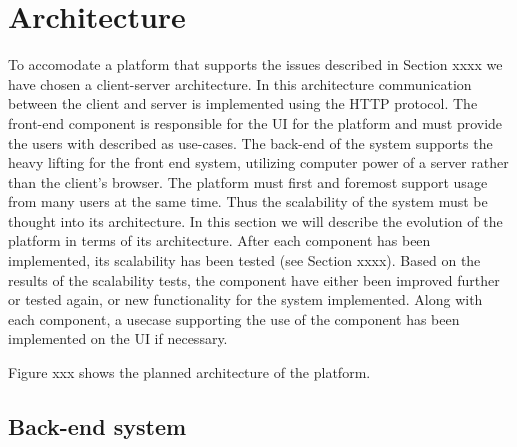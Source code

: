 \section{Architecture}
To accomodate a platform that supports the issues described in Section xxxx  we have chosen a client-server architecture. 
In this architecture communication between the client and server is implemented using the HTTP protocol. 
The front-end component is responsible for the UI for the platform and must provide the users with described as use-cases.
The back-end of the system supports the heavy lifting for the front end system, utilizing computer power of a server rather than the client's browser. 
The platform must first and foremost support usage from many users at the same time. 
Thus the scalability of the system must be thought into its architecture. 
In this section we will describe the evolution of the platform in terms of its architecture.
After each component has been implemented, its scalability has been tested (see Section xxxx).
Based on the results of the scalability tests, the component have either been improved further or tested again, or new functionality for the system implemented. 
Along with each component, a usecase supporting the use of the component has been implemented on the UI if necessary. 


Figure xxx shows the planned architecture of the platform. 



\subsection{Back-end system}

